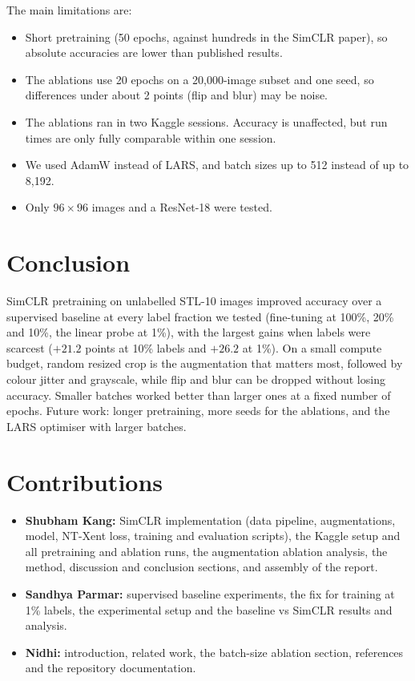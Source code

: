 \documentclass[11pt,a4paper]{article}
\begin{document}
The main limitations are:
\begin{itemize}
  \item Short pretraining (50 epochs, against hundreds in the SimCLR paper), so absolute accuracies are lower
  than published results.
  \item The ablations use 20 epochs on a 20,000-image subset and one seed, so differences under about 2 points
  (flip and blur) may be noise.
  \item The ablations ran in two Kaggle sessions. Accuracy is unaffected, but run times are only fully
  comparable within one session.
  \item We used AdamW instead of LARS, and batch sizes up to 512 instead of up to 8,192.
  \item Only $96\times96$ images and a ResNet-18 were tested.
\end{itemize}

\section{Conclusion}\label{sec:conclusion}
SimCLR pretraining on unlabelled STL-10 images improved accuracy over a supervised baseline at every label
fraction we tested (fine-tuning at 100\%, 20\% and 10\%, the linear probe at 1\%), with the largest gains when
labels were scarcest ($+21.2$ points at 10\% labels and $+26.2$ at 1\%). On a small compute budget, random
resized crop is the augmentation that matters most, followed by colour jitter and grayscale, while flip and blur
can be dropped without losing accuracy. Smaller batches worked better than larger ones at a fixed number of
epochs. Future work: longer pretraining, more seeds for the ablations, and the LARS optimiser with larger
batches.

\section*{Contributions}
\begin{itemize}
  \item \textbf{Shubham Kang:} SimCLR implementation (data pipeline, augmentations, model, NT-Xent loss,
  training and evaluation scripts), the Kaggle setup and all pretraining and ablation runs, the augmentation
  ablation analysis, the method, discussion and conclusion sections, and assembly of the report.
  \item \textbf{Sandhya Parmar:} supervised baseline experiments, the fix for training at 1\% labels, the
  experimental setup and the baseline vs SimCLR results and analysis.
  \item \textbf{Nidhi:} introduction, related work, the batch-size ablation section, references and the
  repository documentation.
\end{itemize}
\end{document}
